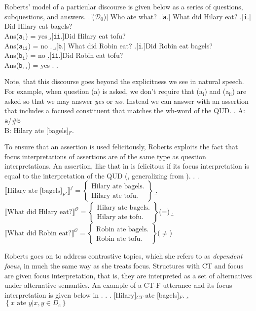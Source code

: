 \documentclass[letterpaper]{article}
\begin{document}
Roberts' model of a particular discourse is given below as a series of questions, subquestions, and answers. 
\ex.[($\mathcal{D}_0$)] Who ate what?
	\a.[\texttt{a}.] What did Hilary eat?
		\a.[\texttt{i}.] Did Hilary eat bagels?\\
		Ans(\texttt{a}$_\texttt{i}$) = yes
		\b.[\texttt{ii}.]Did Hilary eat tofu?\\
		Ans(\texttt{a}$_\texttt{ii}$) = no
		\z.
	\b.[\texttt{b}.] What did Robin eat?
		\a.[\texttt{i}.]Did Robin eat bagels?\\
		Ans(\texttt{b}$_\texttt{i}$) = no
		\b.[\texttt{ii}.]Did Robin eat tofu?\\
		Ans(\texttt{b}$_\texttt{ii}$) = yes
		\z.
	\z.

Note, that this discourse goes beyond the explicitness we see in natural speech.
For example, when question (a) is asked, we don't require that (a$_\text{i}$) and (a$_\text{ii}$) are asked so that we may answer \textit{yes} or \textit{no}.
Instead we can answer with an assertion that includes a focused constituent that matches the wh-word of the QUD.
\ex. A: \texttt{a}/\#\texttt{b}\\
B: Hilary ate [bagels]$_F$.

To ensure that an assertion is used felicitously, Roberts exploits the fact that focus interpretations of assertions are of the same type as question interpretations.
An assertion, like that in \Last is felicitous if its focus interpretation is equal to the interpretation of the QUD (\cite[31]{roberts2012information}, generalizing from \cite{stechow1991focusing}).
\ex.
\a.
$\llbracket\text{Hilary ate [bagels]}_F.\rrbracket^f = 
\begin{Bmatrix}
  \text{Hilary ate bagels.}\\
  \text{Hilary ate tofu.}
\end{Bmatrix}
$
\b.
$\llbracket\text{What did Hilary eat?}\rrbracket^\mathcal{O} =
\begin{Bmatrix}
  \text{Hilary ate bagels.}\\
  \text{Hilary ate tofu.}
\end{Bmatrix}
$\hfill (=\Last[a])
\b.
$\llbracket\text{What did Robin eat?}\rrbracket^\mathcal{O} =
\begin{Bmatrix}
  \text{Robin ate bagels.}\\
  \text{Robin ate tofu.}
\end{Bmatrix}
$\hfill ($\neq$\Last[a])

Roberts goes on to address contrastive topics, which she refers to as \textit{dependent focus}, in much the same way as she treats focus.
Structures with CT and focus are given focus interpretation, that is, they are interpreted as a set of alternatives under alternative semantics.
An example of a CT-F utterance and its focus interpretation is given below in \Next.
\ex.
\a. [Hilary]$_{CT}$ ate [bagels]$_F$.
\b. $\left\{ x\text{ ate }y | x,y \in D_e \right\}$
\end{document}
